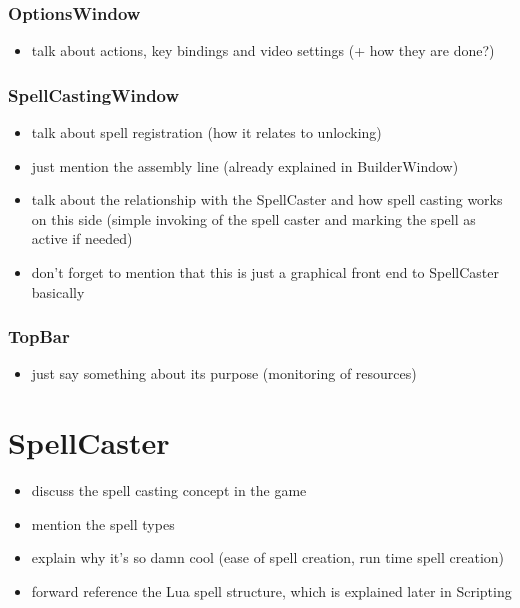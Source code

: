 \subsubsection{OptionsWindow}

\begin{itemize}
    \item talk about actions, key bindings and video settings
        (+ how they are done?)
\end{itemize}

\subsubsection{SpellCastingWindow}

\begin{itemize}
    \item talk about spell registration (how it relates to unlocking)
    \item just mention the assembly line (already explained in BuilderWindow)
    \item talk about the relationship with the SpellCaster and how spell casting
        works on this side (simple invoking of the spell caster and marking
        the spell as active if needed)
    \item don't forget to mention that this is just a graphical front end
        to SpellCaster basically
\end{itemize}

\subsubsection{TopBar}

\begin{itemize}
    \item just say something about its purpose (monitoring of resources)
\end{itemize}

\section{SpellCaster}

\begin{itemize}
    \item discuss the spell casting concept in the game
    \item mention the spell types
    \item explain why it's so damn cool (ease of spell creation, run time spell creation)
    \item forward reference the Lua spell structure, which is explained later in Scripting
\end{itemize}

